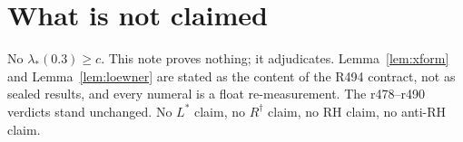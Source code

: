 \documentclass[11pt]{article}
\theoremstyle{remark}
\begin{document}
\section{What is not claimed}

No $\lambda_*(0.3)\ge c$.  This note proves nothing; it
adjudicates.  Lemma~\ref{lem:xform} and
Lemma~\ref{lem:loewner} are stated as the content of the R494
contract, not as sealed results, and every numeral is a float
re-measurement.
The r478--r490 verdicts stand unchanged.
No $L^*$ claim, no $R^\dagger$ claim, no RH claim,
no anti-RH claim.
\end{document}
